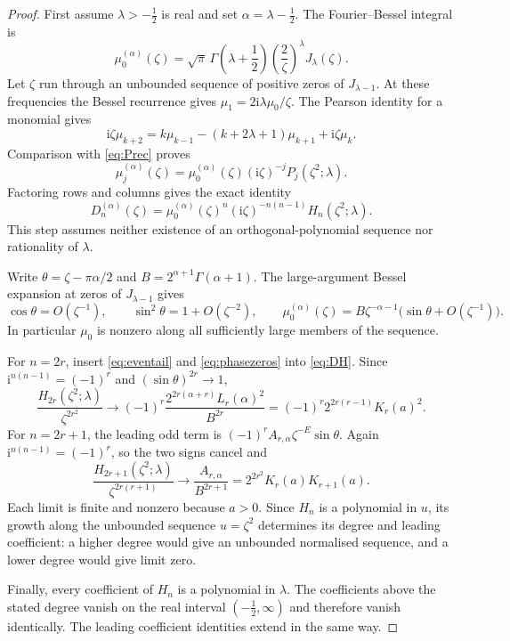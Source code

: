 \documentclass[11pt]{article}
\numberwithin{equation}{section}
\theoremstyle{remark}
\newcommand{\ii}{\mathrm{i}}
\begin{document}
\begin{proof}
First assume $\lambda>-\tfrac12$ is real and set
$\alpha=\lambda-\tfrac12$. The Fourier--Bessel integral is
\begin{equation}\label{eq:muBessel}
 \mu_0^{(\alpha)}(\zeta)=
 \sqrt\pi\,\Gamma\left(\lambda+\frac12\right)
                    \left(\frac2\zeta\right)^\lambda J_\lambda(\zeta).
\end{equation}
Let $\zeta$ run through an unbounded sequence of positive zeros of
$J_{\lambda-1}$. At these frequencies the Bessel recurrence gives
$\mu_1=2\ii\lambda\mu_0/\zeta$. The Pearson identity for a monomial
gives
\[
 \ii\zeta\mu_{k+2}
   =k\mu_{k-1}-(k+2\lambda+1)\mu_{k+1}+\ii\zeta\mu_k.
\]
Comparison with \eqref{eq:Prec} proves
\begin{equation}\label{eq:Pmoment}
 \mu_j^{(\alpha)}(\zeta)
 =\mu_0^{(\alpha)}(\zeta)(\ii\zeta)^{-j}P_j(\zeta^2;\lambda).
\end{equation}
Factoring rows and columns gives the exact identity
\begin{equation}\label{eq:DH}
 D_n^{(\alpha)}(\zeta)=
 \mu_0^{(\alpha)}(\zeta)^n(\ii\zeta)^{-n(n-1)}H_n(\zeta^2;\lambda).
\end{equation}
This step assumes neither existence of an orthogonal-polynomial
sequence nor rationality of $\lambda$.

Write $\theta=\zeta-\pi\alpha/2$ and
$B=2^{\alpha+1}\Gamma(\alpha+1)$. The large-argument Bessel expansion
at zeros of $J_{\lambda-1}$ gives
\begin{equation}\label{eq:phasezeros}
 \cos\theta=O(\zeta^{-1}),\qquad
 \sin^2\theta=1+O(\zeta^{-2}),\qquad
 \mu_0^{(\alpha)}(\zeta)
 =B\zeta^{-\alpha-1}\bigl(\sin\theta+O(\zeta^{-1})\bigr).
\end{equation}
In particular $\mu_0$ is nonzero along all sufficiently large members
of the sequence.

For $n=2r$, insert \eqref{eq:eventail} and \eqref{eq:phasezeros} into
\eqref{eq:DH}. Since $\ii^{n(n-1)}=(-1)^r$ and
$(\sin\theta)^{2r}\to1$,
\[
 \frac{H_{2r}(\zeta^2;\lambda)}{\zeta^{2r^2}}
 \longrightarrow
 (-1)^r\frac{2^{2r(\alpha+r)}L_r(\alpha)^2}{B^{2r}}
 =(-1)^r2^{2r(r-1)}K_r(a)^2.
\]
For $n=2r+1$, the leading odd term is
$(-1)^rA_{r,\alpha}\zeta^{-E}\sin\theta$.
Again $\ii^{n(n-1)}=(-1)^r$, so the two signs cancel and
\[
 \frac{H_{2r+1}(\zeta^2;\lambda)}{\zeta^{2r(r+1)}}
 \longrightarrow
 \frac{A_{r,\alpha}}{B^{2r+1}}
 =2^{2r^2}K_r(a)K_{r+1}(a).
\]
Each limit is finite and nonzero because $a>0$.
Since $H_n$ is a polynomial in $u$, its growth along the unbounded
sequence $u=\zeta^2$ determines its degree and leading coefficient:
a higher degree would give an unbounded normalised sequence, and a
lower degree would give limit zero.

Finally, every coefficient of $H_n$ is a polynomial in $\lambda$.
The coefficients above the stated degree vanish on the real interval
$(-\tfrac12,\infty)$ and therefore vanish identically. The leading
coefficient identities extend in the same way.
\end{proof}
\end{document}
